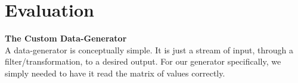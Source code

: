 \section{Evaluation}

\textbf{The Custom Data-Generator}
\\
A data-generator is conceptually simple. It is just a stream of input, through a filter/transformation, to a desired output.
For our generator specifically, we simply needed to have it read the matrix of values correctly.
